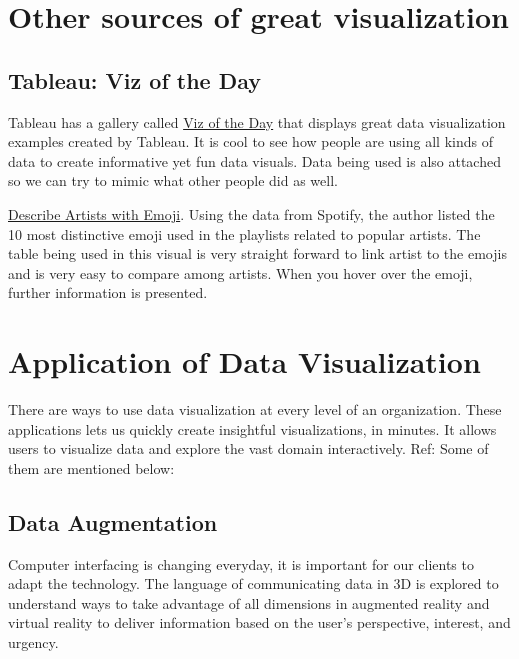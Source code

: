 \documentclass[]{book}
\theoremstyle{definition}
\theoremstyle{definition}
\theoremstyle{definition}
\theoremstyle{remark}
\begin{document}
\section{Other sources of great
visualization}\label{other-sources-of-great-visualization}

\subsection{Tableau: Viz of the Day}\label{tableau-viz-of-the-day}

Tableau has a gallery called
\href{https://public.tableau.com/en-us/s/gallery}{Viz of the Day} that
displays great data visualization examples created by Tableau. It is
cool to see how people are using all kinds of data to create informative
yet fun data visuals. Data being used is also attached so we can try to
mimic what other people did as well.

\href{https://public.tableau.com/en-us/s/gallery/what-emoji-say-about-music?gallery=featured}{Describe
Artists with Emoji}. Using the data from Spotify, the author listed the
10 most distinctive emoji used in the playlists related to popular
artists. The table being used in this visual is very straight forward to
link artist to the emojis and is very easy to compare among artists.
When you hover over the emoji, further information is presented.

\section{Application of Data
Visualization}\label{application-of-data-visualization}

There are ways to use data visualization at every level of an
organization. These applications lets us quickly create insightful
visualizations, in minutes. It allows users to visualize data and
explore the vast domain interactively. Ref: \citep{app1} Some of them
are mentioned below:

\subsection{Data Augmentation}\label{data-augmentation}

\citep{ref_pdf_ar}

Computer interfacing is changing everyday, it is important for our
clients to adapt the technology. The language of communicating data in
3D is explored to understand ways to take advantage of all dimensions in
augmented reality and virtual reality to deliver information based on
the user's perspective, interest, and urgency.
\end{document}
